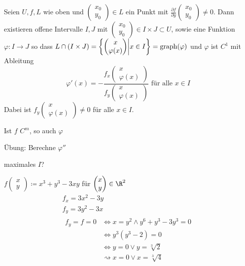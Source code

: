 \begin{satz*}
	Seien $U, f, L$ wie oben und $\begin{pmatrix} x_0 \\ y_0 \end{pmatrix} \in L$ ein Punkt mit $\frac{\partial f}{\partial y}\begin{pmatrix} x_0 \\ y_0 \end{pmatrix} \neq 0$. Dann existieren offene Intervalle $I , J$ mit $\begin{pmatrix} x_0 \\ y_0 \end{pmatrix} \in I \times J \subset U$, sowie eine Funktion $\varphi : I \rightarrow J$ so dass $L \cap ( I \times J ) = \left\{ \begin{pmatrix} x \\ \varphi(x) \end{pmatrix} \middle| x \in I \right\} = \operatorname{graph}(\varphi)$ und $\varphi$ ist $C^1$ mit Ableitung
	\[ \varphi'(x) = -\frac{f_x\begin{pmatrix} x \\ \varphi(x) \end{pmatrix}}{f_y\begin{pmatrix} x \\ \varphi(x) \end{pmatrix}} \text{ für alle } x \in I \]
	Dabei ist $f_y\begin{pmatrix} x \\ \varphi(x) \end{pmatrix} \neq 0$ für alle $x \in I$.
	
	Ist $f$ $C^m$, so auch $\varphi$
\end{satz*}
Übung: Berechne $\varphi''$ \\
\begin{bem}
	maximales $I$?
\end{bem}
\begin{bsp}
	$f\begin{pmatrix} x \\ y \end{pmatrix} \coloneqq x^3 + y^3 - 3xy$ für $\begin{pmatrix} x \\ y \end{pmatrix} \in \R^2$
	\begin{gather*}
		f_x = 3x^2 - 3y \\
		f_y = 3y^2 - 3x \\
		\begin{split}
			f_y = f = 0
				&\iff x = y^2 \wedge y^6 + y^3 - 3y^3 = 0 \\
				&\iff y^3 ( y^3 - 2 ) = 0 \\
				&\iff y = 0 \vee y = \sqrt[3]{2} \\
				&\rightsquigarrow x = 0 \vee x = \sqrt[3]{4}
		\end{split}
	\end{gather*}
\end{bsp}
